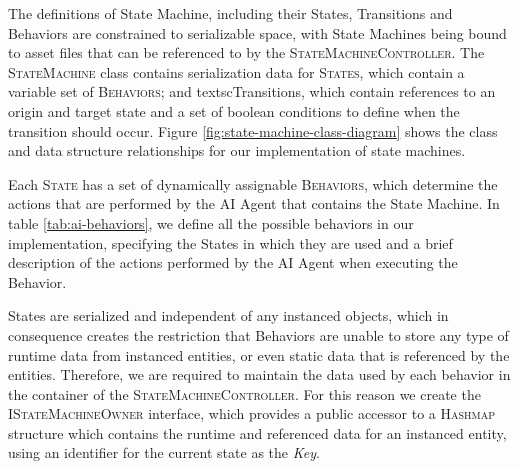 The definitions of State Machine, including their States, Transitions and Behaviors are constrained to serializable space, with State Machines being bound to asset files that can be referenced to by the \textsc{StateMachineController}. The \textsc{StateMachine} class contains serialization data for \textsc{States}, which contain a variable set of \textsc{Behaviors}; and textsc{Transitions}, which contain references to an origin and target state and a set of boolean conditions to define when the transition should occur. Figure \ref{fig:state-machine-class-diagram} shows the class and data structure relationships for our implementation of state machines.



Each \textsc{State} has a set of dynamically assignable \textsc{Behaviors}, which determine the actions that are performed by the AI Agent that contains the State Machine. In table \ref{tab:ai-behaviors}, we define all the possible behaviors in our implementation, specifying the States in which they are used and a brief description of the actions performed by the AI Agent when executing the Behavior.



States are serialized and independent of any instanced objects, which in consequence creates the restriction that Behaviors are unable to store any type of runtime data from instanced entities, or even static data that is referenced by the entities. Therefore, we are required to maintain the data used by each behavior in the container of the \textsc{StateMachineController}. For this reason we create the \textsc{IStateMachineOwner} interface, which provides a public accessor to a \textsc{Hashmap} structure which contains the runtime and referenced data for an instanced entity, using an identifier for the current state as the \emph{Key}.

